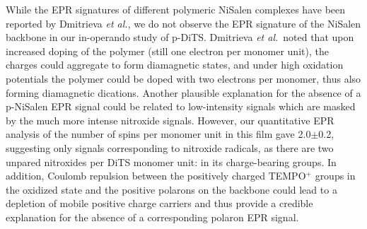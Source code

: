 \par
While the EPR signatures of different polymeric NiSalen complexes have been reported by Dmitrieva \textit{et al.},\cite{Dmitrieva2018} we do not observe the EPR signature of the NiSalen backbone in our in-operando study of p-DiTS. Dmitrieva \textit{et al.}\ noted that upon increased doping of the polymer (still one electron per monomer unit), the charges could aggregate to form diamagnetic states, and under high oxidation potentials the polymer could be doped with two electrons per monomer, thus also forming diamagnetic dications. Another plausible explanation for the absence of a p-NiSalen EPR signal could be related to low-intensity signals which are masked by the much more intense nitroxide signals. However, our quantitative EPR analysis of the number of spins per monomer unit in this film gave 2.0$\pm$0.2, suggesting only signals corresponding to nitroxide radicals, as there are two unpared nitroxides per DiTS monomer unit: in its charge-bearing groups.
In addition, Coulomb repulsion between the positively charged TEMPO$^+$ groups in the oxidized state and the positive polarons on the backbone could lead to a depletion of mobile positive charge carriers and thus provide a credible explanation for the absence of a corresponding polaron EPR signal.\\
\newpage




